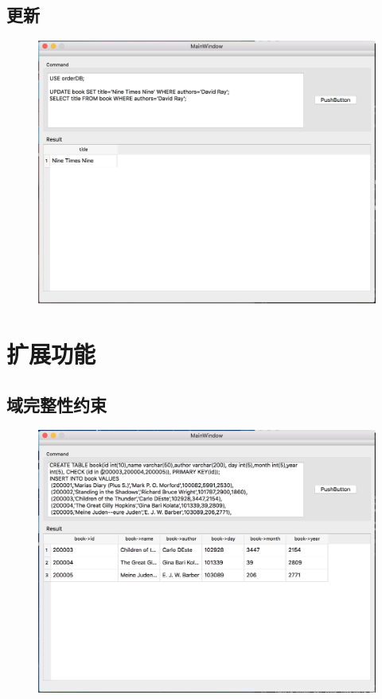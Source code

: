 \subsection{更新}
\begin{figure}[H]
\centering
\includegraphics[width=5in]{Figures/screen_shot/update.png}
\end{figure}

\section{扩展功能}
\subsection{域完整性约束}
\begin{figure}[H]
\centering
\includegraphics[width=4.75in]{Figures/screen_shot/check.png}
\end{figure}

